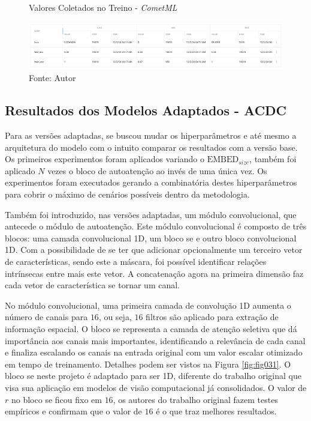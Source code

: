 \begin{figure}[h!]
    \centering
    \caption{Valores Coletados no Treino - \textit{CometML}}
    \includegraphics[width=1\textwidth]{figures/fig029.png}
    \caption*{Fonte: Autor}
    \label{fig:fig029}
\end{figure}


\subsection{Resultados dos Modelos Adaptados - ACDC}
\label{subsec:resultados_acdc_adaptado}

Para as versões adaptadas, se buscou mudar os hiperparâmetros e até mesmo a arquitetura do modelo com o intuito comparar os resultados com a versão base. Os primeiros experimentos foram aplicados variando o $\text{EMBED}_{size}$, também foi aplicado $N$ vezes o bloco de autoatenção ao invés de uma única vez. Os experimentos foram executados gerando a combinatória destes hiperparâmetros para cobrir o máximo de cenários possíveis dentro da metodologia.

Também foi introduzido, nas versões adaptadas, um módulo convolucional, que antecede o módulo de autoatenção. Este módulo convolucional é composto de três blocos: uma camada convolucional 1D, um bloco \gls{se} e outro bloco convolucional 1D. Com a possibilidade de se ter que adicionar opcionalmente um terceiro vetor de características, sendo este a máscara, foi possível identificar relações intrínsecas entre mais este vetor. A concatenação agora na primeira dimensão faz cada vetor de característica se tornar um canal. 

No módulo convolucional, uma primeira camada de convolução 1D aumenta o número de canais para $16$, ou seja, $16$ filtros são aplicado para extração de informação espacial. O bloco \gls{se} representa a camada de atenção seletiva que dá importância aos canais mais importantes, identificando a relevância de cada canal e finaliza escalando os canais na entrada original com um valor escalar otimizado em tempo de treinamento. Detalhes podem ser vistos na Figura \ref{fig:fig031}. O bloco \gls{se} neste projeto é adaptado para ser 1D, diferente do trabalho original que visa sua aplicação em modelos de visão computacional já consolidados. O valor de $r$ no bloco \gls{se} ficou fixo em $16$, os autores do trabalho original fazem testes empíricos e confirmam que o valor de $16$ é o que traz melhores resultados.

